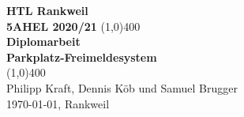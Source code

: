 \begin{titlepage}
  \begin{center}
    \vspace*{1cm}
    \large{\textbf{HTL Rankweil}}\\
    \large{\textbf{5AHEL 2020/21}}
    \vfill
    \line(1,0){400}\\[1mm]
    \huge{\textbf{Diplomarbeit}}\\[3mm]
    \large{\textbf{Parkplatz-Freimeldesystem}}\\[1mm]
    \line(1,0){400}\\
    \vfill
    Philipp Kraft, Dennis Köb und Samuel Brugger\\[3mm]
    \today, Rankweil
  \end{center}
\end{titlepage}